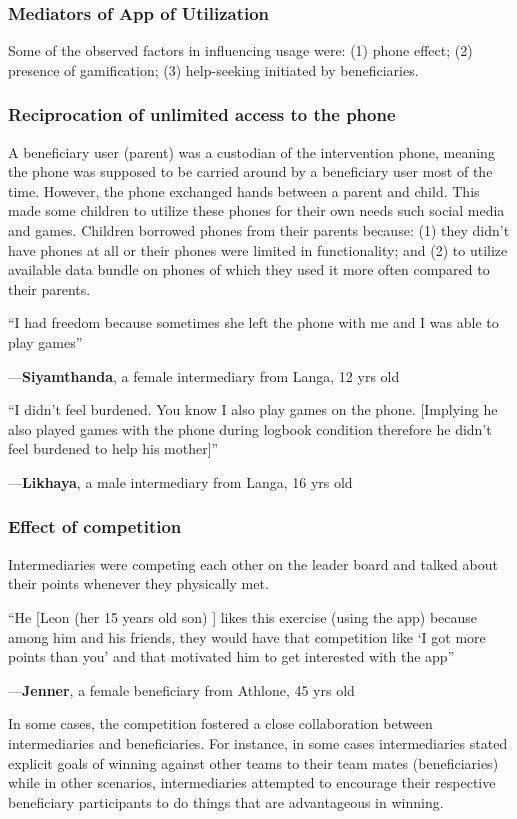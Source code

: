 \documentclass{sig-alternate}
\newenvironment{myquote}
               {\list{}{\rightmargin   \leftmargin
                        \parsep        0in }%
                \item\relax}
               {\endlist}
\newcommand{\userquote}[2]{\begin{samepage}\begin{myquote} 
     \em{\small{#2\begin{flushright}---#1\end{flushright}}}
   \end{myquote}\end{samepage}}
\begin{document}
\subsubsection{Mediators of App of Utilization}
Some of the observed factors in influencing usage were: (1) phone effect; (2) presence of gamification; (3) help-seeking initiated by beneficiaries.
\subsubsection*{\textbf{Reciprocation of unlimited access to the phone}}
A beneficiary user (parent) was a custodian of the intervention phone, meaning the phone was supposed to be carried around by a beneficiary user most of the time. However, the phone exchanged hands between a parent and child. This made some children to utilize these phones for their own needs such social media and games. Children borrowed phones from their parents because: (1) they didn't have phones at all or their phones were limited in functionality; and (2) to utilize available data bundle on phones of which they used it more often compared to their parents.

\userquote{\textbf{Siyamthanda}, a female intermediary from Langa, 12 yrs old} {``I had freedom because sometimes she left the phone with me and I was able to play games''}

\userquote{\textbf{Likhaya}, a male intermediary from Langa, 16 yrs old} {``I didn't feel burdened. You know I also play games on the phone. [Implying he also played games with the phone during logbook condition therefore he didn't feel burdened to help his mother]''} 
\subsubsection*{\textbf{Effect of competition}}
Intermediaries were competing each other on the leader board and talked about their points whenever they physically met.

\userquote{\textbf{Jenner}, a female beneficiary from Athlone, 45 yrs old} {``He [Leon (her 15 years old son) ] likes this exercise (using the app) because among him and his friends, they would have that competition like `I got more points than you' and that motivated him to get interested with the app''} 

In some cases, the competition fostered a close collaboration between intermediaries and beneficiaries. For instance, in some cases intermediaries stated explicit goals of winning against other teams to their team mates (beneficiaries) while in other scenarios, intermediaries attempted to encourage their respective beneficiary participants to do things that are advantageous in winning.
\end{document}
